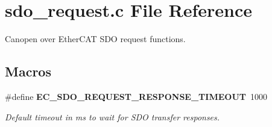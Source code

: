 \section{sdo\-\_\-request.\-c File Reference}
\label{sdo__request_8c}


Canopen over Ether\-C\-A\-T S\-D\-O request functions.  


\subsection*{Macros}
\begin{DoxyCompactItemize}
\item 
\#define {\bf E\-C\-\_\-\-S\-D\-O\-\_\-\-R\-E\-Q\-U\-E\-S\-T\-\_\-\-R\-E\-S\-P\-O\-N\-S\-E\-\_\-\-T\-I\-M\-E\-O\-U\-T}~1000\label{sdo__request_8c_a90de0444ea60b7bb1d18233f1152b249}

\begin{DoxyCompactList}\small\item\em Default timeout in ms to wait for S\-D\-O transfer responses. \end{DoxyCompactList}\end{DoxyCompactItemize}
